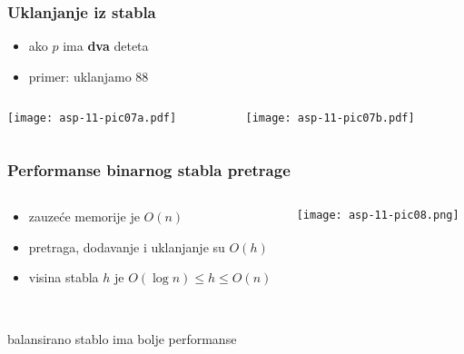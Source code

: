 \documentclass[compress,aspectratio=169]{beamer}
\begin{document}
\begin{frame}[fragile]
  \frametitle{Uklanjanje iz stabla}
  \begin{itemize}
    \item ako $p$ ima \textbf{dva} deteta
    \item primer: uklanjamo 88
  \end{itemize}
  \begin{columns}
    \begin{column}[c]{6cm}
      \begin{center}
        \texttt{[image: asp-11-pic07a.pdf]}
      \end{center}
    \end{column}  
    \begin{column}[c]{6cm}
      \begin{center}
        \texttt{[image: asp-11-pic07b.pdf]}
      \end{center}
    \end{column}  
  \end{columns}
\end{frame}

\begin{frame}[fragile]
  \frametitle{Performanse binarnog stabla pretrage}
  \begin{columns}
    \begin{column}[c]{6cm}
      \begin{itemize}
        \item zauzeće memorije je $O(n)$
        \item pretraga, dodavanje i uklanjanje su $O(h)$
        \item visina stabla $h$ je $O(\log n) \leq h \leq O(n)$
      \end{itemize}
    \end{column}  
    \begin{column}[c]{6cm}
      \begin{center}
        \texttt{[image: asp-11-pic08.png]}
      \end{center}
    \end{column}  
  \end{columns}
  \ \\ \hfill balansirano stablo ima bolje performanse
\end{frame}
\end{document}
